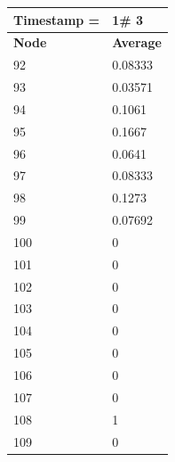 \begin{tabular}{|l||l|}
\hline
\textbf{Timestamp =} & \textbf{1}\# 3\\\hline
	\textbf{Node} & \textbf{Average} \\ \hline
\hline
	92 & 0.08333 \\ \hline
	93 & 0.03571 \\ \hline
	94 & 0.1061 \\ \hline
	95 & 0.1667 \\ \hline
	96 & 0.0641 \\ \hline
	97 & 0.08333 \\ \hline
	98 & 0.1273 \\ \hline
	99 & 0.07692 \\ \hline
	100 & 0 \\ \hline
	101 & 0 \\ \hline
	102 & 0 \\ \hline
	103 & 0 \\ \hline
	104 & 0 \\ \hline
	105 & 0 \\ \hline
	106 & 0 \\ \hline
	107 & 0 \\ \hline
	108 & 1 \\ \hline
	109 & 0 \\ \hline
\end{tabular}

